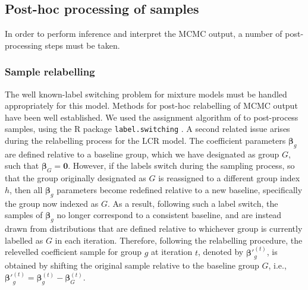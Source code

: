 \documentclass[11pt]{article}
\def\bsbet{\boldsymbol{\beta}}
\theoremstyle{plain}
\theoremstyle{definition}
\begin{document}
\subsection{Post-hoc processing of samples}
In order to perform inference and interpret the MCMC output, a number of post-processing steps must be taken.

\subsubsection{Sample relabelling}
The well known-label switching problem for mixture models \citep{celeux_computational_2000} must be handled appropriately for this model.
Methods for post-hoc relabelling of MCMC output have been well established. We used the assignment algorithm of \citet{stephens_dealing_2000} to post-process samples, using the R package \verb|label.switching| \citep{papastamoulis_labelswitching_2016}. 
A second related issue arises during the relabelling process for the LCR model. The coefficient parameters $\bsbet_g$ are defined relative to a baseline group, which we have designated as group $G$, such that $\bsbet_G = \mathbf{0}$. However, if the labels switch during the sampling process, so that the group originally designated as $G$ is reassigned to a different group index $h$, then all $\bsbet_g$ parameters become redefined relative to a new baseline, specifically the group now indexed as $G$. As a result, following such a label switch, the samples of $\bsbet_g$ no longer correspond to a consistent baseline, and are instead drawn from distributions that are defined relative to whichever group is currently labelled as $G$ in each iteration. Therefore, following the relabelling procedure, the relevelled coefficient sample for group $g$ at iteration $t$, denoted by ${\bsbet'}_g^{(t)}$, is obtained by shifting the original sample relative to the baseline group $G$, i.e., ${\bsbet'}_g^{(t)} = \bsbet_g^{(t)} - \bsbet_G^{(t)}$.
\end{document}
